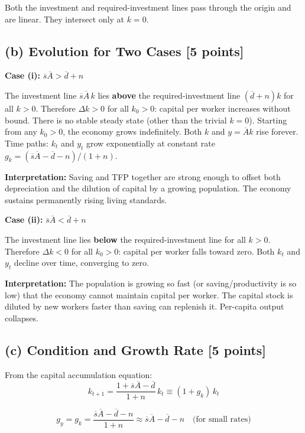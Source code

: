 \documentclass[letterpaper,12pt]{article}
\begin{document}
Both the investment and required-investment lines pass through the origin and are linear. They intersect only at $k=0$.

\subsection*{(b) Evolution for Two Cases [5 points]}

\noindent\textbf{Case (i):} $\overline{s}\overline{A} > \overline{d} + n$

The investment line $\overline{s}\overline{A}\,k$ lies \textbf{above} the required-investment line $(\overline{d}+n)k$ for all $k > 0$. Therefore $\Delta k > 0$ for all $k_0 > 0$: capital per worker increases without bound. There is no stable steady state (other than the trivial $k=0$). Starting from any $k_0 > 0$, the economy grows indefinitely. Both $k$ and $y = \overline{A}k$ rise forever. Time paths: $k_t$ and $y_t$ grow exponentially at constant rate $g_k = (\overline{s}\overline{A} - \overline{d} - n)/(1+n)$.

\noindent\textbf{Interpretation:} Saving and TFP together are strong enough to offset both depreciation and the dilution of capital by a growing population. The economy sustains permanently rising living standards.

\noindent\textbf{Case (ii):} $\overline{s}\overline{A} < \overline{d} + n$

The investment line lies \textbf{below} the required-investment line for all $k > 0$. Therefore $\Delta k < 0$ for all $k_0 > 0$: capital per worker falls toward zero. Both $k_t$ and $y_t$ decline over time, converging to zero.

\noindent\textbf{Interpretation:} The population is growing so fast (or saving/productivity is so low) that the economy cannot maintain capital per worker. The capital stock is diluted by new workers faster than saving can replenish it. Per-capita output collapses.

\subsection*{(c) Condition and Growth Rate [5 points]}

From the capital accumulation equation:
\[
k_{t+1} = \frac{1 + \overline{s}\overline{A} - \overline{d}}{1+n}\,k_t \equiv (1 + g_k)\,k_t
\]

\textcolor{sol}{
\[
g_y = g_k = \frac{\overline{s}\overline{A} - \overline{d} - n}{1+n} \approx \overline{s}\overline{A} - \overline{d} - n \quad \text{(for small rates)}
\]
}
\end{document}
